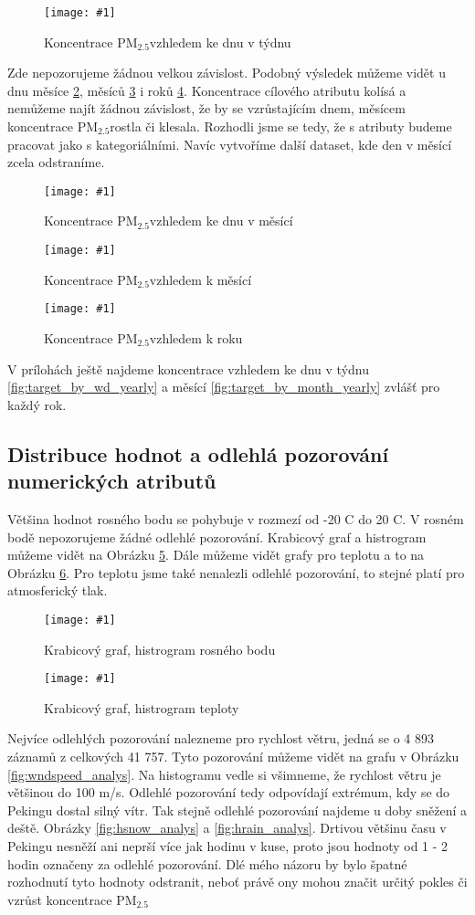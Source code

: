 \documentclass[a4paper,12pt]{article}
\newcommand{\pmQuant}[0]{$\text{PM}_{2.5}$}
\newcommand{\image}[4]{\begin{figure}[ht!] \centering \texttt{[image: \#1]} \caption{#2} \label{#3} \end{figure}}
\begin{document}
\image{target_by_week_day.pdf}{Koncentrace \pmQuant vzhledem ke dnu v týdnu}{fig:target_by_wd}{1.0}

Zde nepozorujeme žádnou velkou závislost. Podobný výsledek můžeme vidět u dnu měsíce \ref{fig:target_by_day}, 
měsíců \ref{fig:target_by_month} i roků \ref{fig:target_by_year}.
Koncentrace cílového atributu kolísá a nemůžeme najít žádnou závislost, že by se vzrůstajícím dnem, měsícem koncentrace
\pmQuant rostla či klesala. Rozhodli jsme se tedy, že s atributy budeme pracovat jako s kategoriálními.
Navíc vytvoříme další dataset, kde den v měsící zcela odstraníme.

\image{target_by_month_day.pdf}{Koncentrace \pmQuant vzhledem ke dnu v měsící}{fig:target_by_day}{1.0}
\image{target_by_month.pdf}{Koncentrace \pmQuant vzhledem k měsící }{fig:target_by_month}{1.0}
\image{target_by_year.pdf}{Koncentrace \pmQuant vzhledem k roku}{fig:target_by_year}{1.0}

V prílohách ještě najdeme koncentrace vzhledem ke dnu v týdnu \ref{fig:target_by_wd_yearly} a měsící \ref{fig:target_by_month_yearly} 
zvlášť pro každý rok.

\FloatBarrier
\subsection{Distribuce hodnot a odlehlá pozorování numerických atributů}
Většina hodnot rosného bodu se pohybuje v rozmezí od -20 \degree C do 20 \degree C. V rosném bodě nepozorujeme
žádné odlehlé pozorování. Krabicový graf a histrogram můžeme vidět na Obrázku \ref{fig:dewpt_analys}. 
Dále můžeme vidět grafy pro teplotu a to na Obrázku \ref{fig:temp_analys}. Pro teplotu jsme také nenalezli
odlehlé pozorování, to stejné platí pro atmosferický tlak.

\image{dewpt.pdf}{Krabicový graf, histrogram rosného bodu}{fig:dewpt_analys}{0.8}
\image{temp.pdf}{Krabicový graf, histrogram teploty}{fig:temp_analys}{0.8}

Nejvíce odlehlých pozorování nalezneme pro rychlost větru, jedná se o 4 893 záznamů z celkových 41 757.
Tyto pozorování můžeme vidět na grafu v Obrázku \ref{fig:wndspeed_analys}. Na histogramu vedle si všimneme,
že rychlost větru je většinou do 100 m/s. Odlehlé pozorování tedy odpovídají extrémum, kdy se do Pekingu dostal silný vítr.
Tak stejně odlehlé pozorování najdeme u doby sněžení a deště. Obrázky \ref{fig:hsnow_analys} a \ref{fig:hrain_analys}.
Drtivou většinu času v Pekingu nesněží ani neprší více jak hodinu v kuse, proto jsou hodnoty od 1 - 2 hodin označeny za odlehlé 
pozorování. Dlé mého názoru by bylo špatné rozhodnutí tyto hodnoty odstranit, neboť právě ony mohou značit
určitý pokles či vzrůst koncentrace \pmQuant
\end{document}
